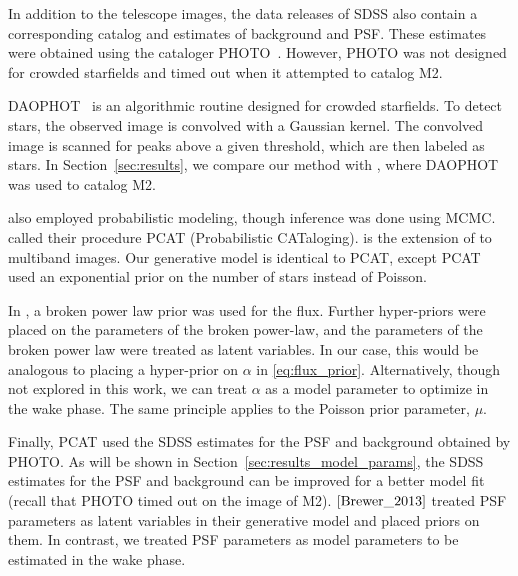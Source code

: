 In addition to the telescope images, the data releases of SDSS also contain 
a corresponding catalog and estimates of background and PSF. These estimates were obtained using the cataloger PHOTO~\cite{lupton2001sdss}. However, PHOTO was not designed for crowded starfields and timed out when it attempted to catalog M2. 

DAOPHOT~\cite{stetson2987daophot} is an algorithmic routine designed for crowded starfields. To detect stars, the observed image is convolved with a Gaussian kernel. The convolved image is scanned for peaks above a given threshold, which are then labeled as stars. In Section~\ref{sec:results}, we compare our method with \cite{An_2008_m2}, where DAOPHOT was used to catalog M2. 

\cite{Brewer_2013, Portillo_2017, Feder_2019} also employed probabilistic modeling, though inference was done using MCMC. \cite{Portillo_2017, Feder_2019} called their procedure PCAT (Probabilistic CATaloging). \cite{Feder_2019} is the extension 
of \cite{Portillo_2017} to multiband images. Our generative model is identical to PCAT, except PCAT used an exponential prior on the number of stars instead of Poisson. 

In \cite{Brewer_2013}, a broken power law prior was used for the flux. 
Further hyper-priors were placed on the parameters of the broken power-law, and the parameters of the broken power law were treated as latent variables. In our case, this would be analogous to placing a hyper-prior on $\alpha$ in \eqref{eq:flux_prior}. Alternatively, though not explored in this work, we can treat $\alpha$ as a model parameter to optimize in the wake phase. The same principle applies to the Poisson prior parameter, $\mu$. 

Finally, PCAT used the SDSS estimates for the PSF and background obtained by PHOTO.
As will be shown in Section~\ref{sec:results_model_params}, the SDSS estimates for the PSF and background can be improved for a better model fit (recall that PHOTO timed out 
on the image of M2). $\cite{Brewer_2013}$ treated PSF parameters as latent variables in their generative model and placed priors on them. In contrast, we treated PSF parameters as model parameters to be estimated in the wake phase. 

